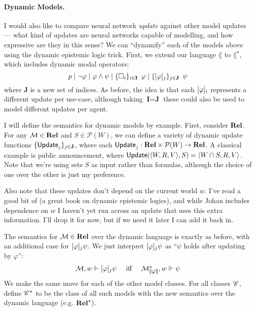 \documentclass[letterpaper]{article}
\begin{document}
\paragraph*{Dynamic Models.}

I would also like to compare neural network \emph{update} against other model updates --- what kind of updates are neural networks capable of modelling, and how expressive are they in this sense?  We can ``dynamify'' each of the models above using the dynamic epistemic logic trick.  First, we extend our language $\lang$ to $\lang^\star$, which includes dynamic modal operators:
\[
    p \mid \neg \varphi \mid \varphi \land \psi \mid \{ \Box_i \}_{i \in \textbf{I}} \hspace*{0.5em} \varphi \mid \{ [\varphi]_j \}_{j \in \textbf{J}} \hspace*{0.5em} \psi
\]
where \textbf{J} is a new set of indices.  As before, the idea is that each $[\varphi]_i$ represents a different update per use-case, although taking $\textbf{I} = \textbf{J}$ these could also be used to model different updates per agent.

I will define the semantics for dynamic models by example.  First, consider $\textrm{\textbf{Rel}}$.  For any $\mathcal{M} \in \textrm{\textbf{Rel}}$ and $S \in \mathcal{P}(W)$, we can define a variety of dynamic update functions $\{ \mathsf{Update}_j \}_{j \in \textbf{J}}$, where each $\mathsf{Update}_j : \textrm{\textbf{Rel}} \times \mathcal{P}(W) \to \textrm{\textbf{Rel}}$.  A classical example is public announcement, where $\mathsf{Update}(\langle W, R, V \rangle, S) = \langle W \cap S, R, V \rangle$.  Note that we're using sets $S$ as input rather than formulas, although the choice of one over the other is just my preference.

Also note that these updates don't depend on the current world $w$.  I've read a good bit of \cite{van2011logicaldynamics} (a great book on dynamic epistemic logics), and while Johan includes dependence on $w$ I haven't yet run across an update that uses this extra information.  I'll drop it for now, but if we need it later I can add it back in.

The semantics for $\mathcal{M} \in \textrm{\textbf{Rel}}$ over the dynamic language is exactly as before, with an additional case for $[\varphi]_j \psi$.  We just interpret $[\varphi]_j \psi$ as ``$\psi$ holds after updating by $\varphi$'':
\[
\begin{array}{lcl}
    \mathcal{M}, w \Vdash [\varphi]_j \psi & \mbox{ iff } & \mathcal{M}^\star_{[\![\mbox{\em $ \varphi $\/}]\!]}, w \Vdash \psi
\end{array}
\]
We make the same move for each of the other model classes.  For all classes $\mathscr{C}$, define $\mathscr{C}^\star$ to be the class of all such models with the new semantics over the dynamic language (e.g. $\textrm{\textbf{Rel}}^\star$).
\end{document}
